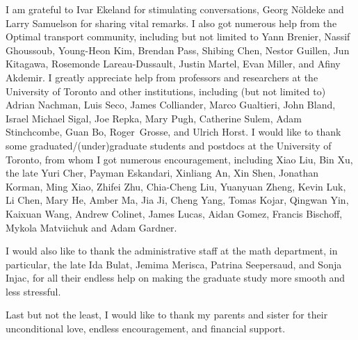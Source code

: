 \documentclass{ut-thesis}[10pt]
\theoremstyle{plain}
\theoremstyle{definition}
\theoremstyle{remark}
\numberwithin{equation}{section}
\begin{document}
\begin{preliminary}
\begin{acknowledgements}
I am grateful to Ivar Ekeland for stimulating conversations, Georg N\" oldeke and Larry Samuelson for sharing vital remarks.
I also got numerous help from the Optimal transport community, including but not limited to Yann Brenier, Nassif Ghoussoub, Young-Heon Kim, Brendan Pass,  Shibing Chen, Nestor Guillen, Jun Kitagawa, Rosemonde Lareau-Dussault, Justin Martel, Evan Miller, and Afiny Akdemir. I greatly appreciate help from professors and researchers at the University of Toronto and other institutions, including (but not limited to) Adrian Nachman, Luis Seco, James Colliander, Marco Gualtieri, John Bland, Israel Michael Sigal, Joe Repka, Mary Pugh, Catherine Sulem, Adam Stinchcombe, Guan Bo, Roger~Grosse, and Ulrich Horst.
I would like to thank some graduated/(under)graduate students and postdocs at the University of Toronto, from whom I got numerous encouragement, including Xiao Liu, Bin Xu, the late Yuri Cher, Payman Eskandari, Xinliang An, Xin Shen, Jonathan Korman, Ming Xiao, Zhifei Zhu, Chia-Cheng Liu, Yuanyuan Zheng, Kevin Luk, Li Chen, Mary He, Amber Ma, Jia Ji, Cheng Yang, Tomas Kojar, Qingwan Yin, Kaixuan Wang, Andrew Colinet, James Lucas, Aidan Gomez, Francis Bischoff, Mykola Matviichuk and Adam Gardner.
 


I would also like to thank the administrative staff at the math department, in particular, the late Ida Bulat, Jemima Merisca, Patrina Seepersaud, and Sonja Injac, for all their endless help on making the graduate study more smooth and less stressful.  

Last but not the least, I would like to thank my parents and sister for their unconditional love, endless encouragement, and financial support.


\end{acknowledgements}

\tableofcontents




\end{preliminary}
\end{document}
